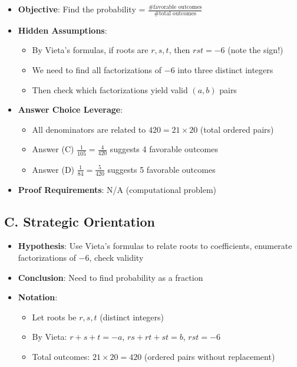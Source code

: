\documentclass[12pt]{article}
\begin{document}
\begin{problemconfigbox}
\begin{itemize}[leftmargin=*]
    \item \textbf{Objective}: Find the probability = $\frac{\text{\# favorable outcomes}}{\text{\# total outcomes}}$
    
    \item \textbf{Hidden Assumptions}: 
    \begin{itemize}
        \item By Vieta's formulas, if roots are $r, s, t$, then $rst = -6$ (note the sign!)
        \item We need to find all factorizations of $-6$ into three distinct integers
        \item Then check which factorizations yield valid $(a,b)$ pairs
    \end{itemize}
    
    \item \textbf{Answer Choice Leverage}: 
    \begin{itemize}
        \item All denominators are related to $420 = 21 \times 20$ (total ordered pairs)
        \item Answer (C) $\frac{1}{105} = \frac{4}{420}$ suggests 4 favorable outcomes
        \item Answer (D) $\frac{1}{84} = \frac{5}{420}$ suggests 5 favorable outcomes
    \end{itemize}
    
    \item \textbf{Proof Requirements}: N/A (computational problem)
\end{itemize}

\subsection*{C. Strategic Orientation}
\begin{itemize}[leftmargin=*]
    \item \textbf{Hypothesis}: Use Vieta's formulas to relate roots to coefficients, enumerate factorizations of $-6$, check validity
    
    \item \textbf{Conclusion}: Need to find probability as a fraction
    
    \item \textbf{Notation}: 
    \begin{itemize}
        \item Let roots be $r, s, t$ (distinct integers)
        \item By Vieta: $r + s + t = -a$, $rs + rt + st = b$, $rst = -6$
        \item Total outcomes: $21 \times 20 = 420$ (ordered pairs without replacement)
    \end{itemize}
    

\end{itemize}
\end{problemconfigbox}
\end{document}
